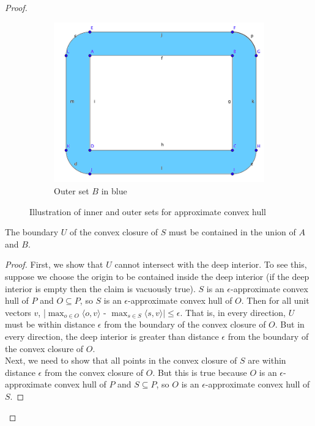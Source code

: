 \begin{proof}
\begin{figure}[!htb]
\begin{subfigure}[b]{.4\linewidth}
\includegraphics[width=\linewidth]{outer_boundary}
\caption{Outer set $B$ in blue}\label{fig:tiger}
\end{subfigure}\hspace{20 mm}
\caption{Illustration of inner and outer sets for approximate convex hull}
\label{fig:animals}
\end{figure}

\begin{lemma}
The boundary $U$ of the convex closure of $S$ must be contained in the union of $A$ and $B$.
\label{lem:sboundary}
\end{lemma}

\begin{proof}
First, we show that $U$ cannot intersect with the deep interior. To see this, suppose we choose the origin to be contained inside the deep interior (if the deep interior is empty then the claim is vacuously true). $S$ is an $\epsilon$-approximate convex hull of $P$ and $O \subseteq P$, so $S$ is an $\epsilon$-approximate convex hull of $O$. Then for all unit vectors $v$, |$\max_{o \in O} \langle o, v \rangle$ - $\max_{s \in S} \langle s, v \rangle| \leq \epsilon$. That is, in every direction, $U$ must be within distance $\epsilon$ from the boundary of the convex closure of $O$. But in every direction, the deep interior is greater than distance $\epsilon$ from the boundary of the convex closure of $O$.
\\

Next, we need to show that all points in the convex closure of $S$ are within distance $\epsilon$ from the convex closure of $O$. But this is true because $O$ is an $\epsilon$-approximate convex hull of $P$ and $S \subseteq P$, so $O$ is an $\epsilon$-approximate convex hull of $S$.
\end{proof}


\end{proof}
